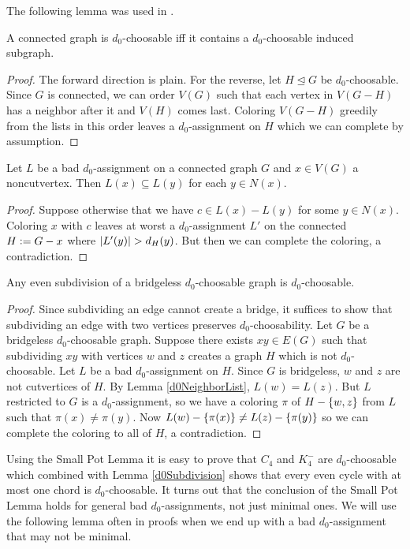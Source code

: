 The following lemma was used in \cite{BrooksExtended}.
\begin{lem}\label{d0Subgraph}
A connected graph is $d_0$-choosable iff it contains a $d_0$-choosable induced subgraph. 
\end{lem}
\begin{proof}
The forward direction is plain.  For the reverse, let $H \unlhd G$ be $d_0$-choosable.  Since $G$ is connected, we can order $V(G)$ such that each vertex in $V(G - H)$ has a neighbor after it and $V(H)$ comes last.  Coloring $V(G-H)$ greedily from the lists in this order leaves a $d_0$-assignment on $H$ which we can complete by assumption.
\end{proof}

\begin{lem}\label{d0NeighborList}
Let $L$ be a bad $d_0$-assignment on a connected graph $G$ and $x \in V(G)$ a noncutvertex. Then $L(x) \subseteq L(y)$ for each $y \in N(x)$.
\end{lem}
\begin{proof}
Suppose otherwise that we have $c \in L(x) - L(y)$ for some $y \in N(x)$.  Coloring $x$ with $c$ leaves at worst a $d_0$-assignment $L'$ on the connected $H \mathrel{\mathop:}= G-x$ where $\left|L'(y)\right| > d_H(y)$.  But then we can complete the coloring, a contradiction.
\end{proof}

\begin{lem}\label{d0Subdivision}
Any even subdivision of a bridgeless $d_0$-choosable graph is $d_0$-choosable.
\end{lem}
\begin{proof}
Since subdividing an edge cannot create a bridge, it suffices to show that subdividing an edge with two vertices preserves $d_0$-choosability.  Let $G$ be a bridgeless $d_0$-choosable graph.  Suppose there exists $xy \in E(G)$ such that subdividing $xy$ with vertices $w$ and $z$ creates a graph $H$ which is not $d_0$-choosable.  Let $L$ be a bad $d_0$-assignment on $H$.  Since $G$ is bridgeless, $w$ and $z$ are not cutvertices of $H$.  By Lemma \ref{d0NeighborList}, $L(w) = L(z)$.  But $L$ restricted to $G$ is a $d_0$-assignment, so we have a coloring $\pi$ of $H - \left\{ w, z \right\}$ from $L$ such that $\pi(x) \neq \pi(y)$.  Now $L(w) - \left\{ \pi(x) \right\} \neq L(z) - \left\{ \pi(y) \right\}$ so we can complete the coloring to all of $H$, a contradiction.
\end{proof}

Using the Small Pot Lemma it is easy to prove that $C_4$ and $K_4^-$ are $d_0$-choosable which combined with Lemma \ref{d0Subdivision} shows that every even cycle with at most one chord is $d_0$-choosable.  It turns out that the conclusion of the Small Pot Lemma holds for general bad $d_0$-assignments, not just minimal ones.  We will use the following lemma often in proofs when we end up with a bad $d_0$-assignment that may not be minimal.

